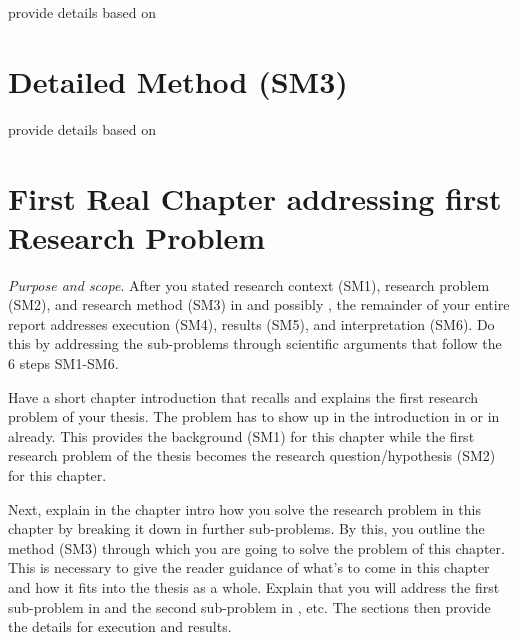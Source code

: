 provide details based on 

\section{Detailed Method (SM3)}\label{sec:problem-exposition:research-method}

provide details based on 

\section{First Real Chapter addressing first Research Problem}\label{sec:problem1}

\emph{Purpose and scope}.
After you stated research context (SM1), research problem (SM2), and research method (SM3) in  and possibly , the remainder of your entire report addresses execution (SM4), results (SM5), and interpretation (SM6).
Do this by addressing the sub-problems through scientific arguments that follow the 6 steps SM1-SM6.

Have a short chapter introduction that recalls and explains the first research problem of your thesis.
The problem has to show up in the introduction in  or in  already.
This provides the background (SM1) for this chapter while the first research problem of the thesis becomes the research question/hypothesis (SM2) for this chapter.

Next, explain in the chapter intro how you solve the research problem in this chapter by breaking it down in further sub-problems.
By this, you outline the method (SM3) through which you are going to solve the problem of this chapter.
This is necessary to give the reader guidance of what's to come in this chapter and how it fits into the thesis as a whole.
Explain that you will address the first sub-problem in  and the second sub-problem in , etc. The sections then provide the details for execution and results.

